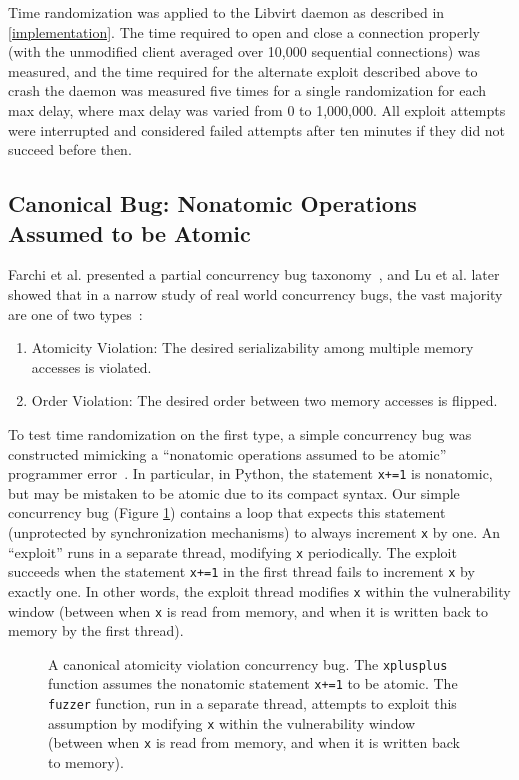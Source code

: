 Time randomization was applied to the Libvirt daemon as described in \autoref{implementation}.
The time required to open and close a connection properly (with the unmodified client averaged over 10,000 sequential connections) was measured, and the time required for the alternate exploit described above to crash the daemon was measured five times for a single randomization for each max delay, where max delay was varied from 0 to 1,000,000.
All exploit attempts were interrupted and considered failed attempts after ten minutes if they did not succeed before then.
\subsection{Canonical Bug: Nonatomic Operations Assumed to be Atomic}
Farchi et al. presented a partial concurrency bug taxonomy~\cite{Farchi2003}, and Lu et al. later showed that in a narrow study of real world concurrency bugs, the vast majority are one of two types~\cite{Lu2008}:
\begin{enumerate}
	\item Atomicity Violation: The desired serializability among multiple memory accesses is violated.
	\item Order Violation: The desired order between two memory accesses is flipped.
\end{enumerate}
To test time randomization on the first type, a simple concurrency bug was
constructed mimicking a ``nonatomic operations assumed to be atomic'' programmer error~\cite{Farchi2003}.
In particular, in Python, the statement \texttt{x+=1} is nonatomic, but may be mistaken to be atomic due to its compact syntax.
Our simple concurrency bug (Figure \ref{fig_nonatomic}) contains a loop that expects this statement (unprotected by synchronization mechanisms) to always increment \texttt{x} by one.
An ``exploit'' runs in a separate thread, modifying \texttt{x} periodically.
The exploit succeeds when the statement \texttt{x+=1} in the first thread fails to increment \texttt{x} by exactly one.
In other words, the exploit thread modifies \texttt{x} within the vulnerability window (between when \texttt{x} is read from memory, and when it is written back to memory by the first thread).
\begin{figure}
	
	\caption{A canonical atomicity violation concurrency bug.  The \texttt{xplusplus} function assumes the nonatomic statement \texttt{x+=1} to be atomic.  The \texttt{fuzzer} function, run in a separate thread, attempts to exploit this assumption by modifying \texttt{x} within the vulnerability window (between when \texttt{x} is read from memory, and when it is written back to memory).}
	\label{fig_nonatomic}
\end{figure}

